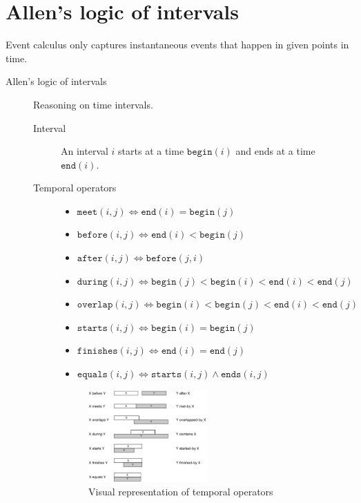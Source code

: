 \section{Allen's logic of intervals}

Event calculus only captures instantaneous events that happen in given points in time.

\begin{description}
    \item[Allen's logic of intervals] 
        Reasoning on time intervals.

        \begin{description}
            \item[Interval]  
                An interval $i$ starts at a time $\texttt{begin}(i)$ and ends at a time $\texttt{end}(i)$.

            \item[Temporal operators] 
                \begin{itemize}
                    \item $\texttt{meet}(i, j) \iff \texttt{end}(i) = \texttt{begin}(j)$
                    \item $\texttt{before}(i, j) \iff \texttt{end}(i) < \texttt{begin}(j)$
                    \item $\texttt{after}(i, j) \iff \texttt{before}(j, i)$
                    \item $\texttt{during}(i, j) \iff \texttt{begin}(j) < \texttt{begin}(i) < \texttt{end}(i) < \texttt{end}(j)$
                    \item $\texttt{overlap}(i, j) \iff \texttt{begin}(i) < \texttt{begin}(j) < \texttt{end}(i) < \texttt{end}(j)$
                    \item $\texttt{starts}(i, j) \iff \texttt{begin}(i) = \texttt{begin}(j)$
                    \item $\texttt{finishes}(i, j) \iff \texttt{end}(i) = \texttt{end}(j)$
                    \item $\texttt{equals}(i, j) \iff \texttt{starts}(i, j) \land \texttt{ends}(i, j)$
                \end{itemize}

                \begin{figure}[H]
                    \centering
                    \includegraphics[width=0.5\textwidth]{img/allen_intervals.png}
                    \caption{Visual representation of temporal operators}
                \end{figure}
        \end{description}
\end{description}
